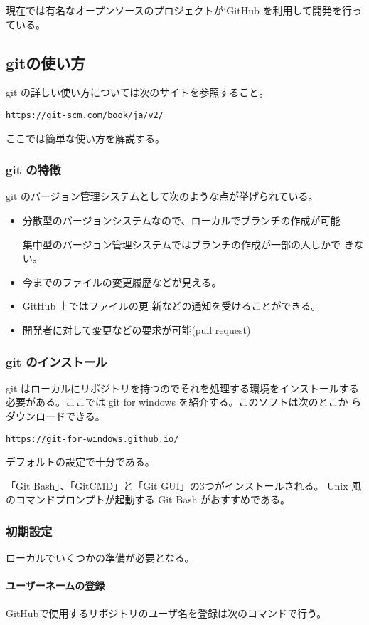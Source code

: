 現在では有名なオープンソースのプロジェクトが`GitHub を利用して開発を行っ
ている。
\subsection{gitの使い方}
git の詳しい使い方については次のサイトを参照すること。

\Verb+https://git-scm.com/book/ja/v2/+

ここでは簡単な使い方を解説する。

\subsubsection{git の特徴}
git のバージョン管理システムとして次のような点が挙げられている。
\begin{itemize}
 \item 分散型のバージョンシステムなので、ローカルでブランチの作成が可能

       集中型のバージョン管理システムではブランチの作成が一部の人しかで
       きない。
 \item 今までのファイルの変更履歴などが見える。
 \item  GitHub 上ではファイルの更
       新などの通知を受けることができる。
 \item 開発者に対して変更などの要求が可能(pull request)
\end{itemize}

\subsubsection{git のインストール}
git はローカルにリポジトリを持つのでそれを処理する環境をインストールする
必要がある。ここでは git for windows を紹介する。このソフトは次のとこか
らダウンロードできる。

\Verb+https://git-for-windows.github.io/+

デフォルトの設定で十分である。

「Git Bash」、「GitCMD」と「Git GUI」の3つがインストールされる。
Unix 風のコマンドプロンプトが起動する Git Bash がおすすめである。

\subsubsection{初期設定}
ローカルでいくつかの準備が必要となる。

\paragraph{ユーザーネームの登録}
GitHubで使用するリポジトリのユーザ名を登録は次のコマンドで行う。

